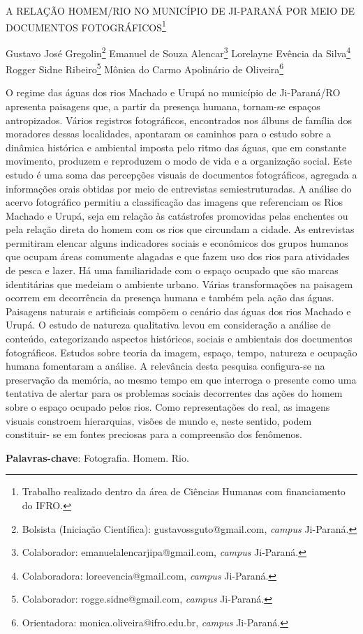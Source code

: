 \documentclass[article,12pt,onesidea,4paper,english,brazil]{abntex2}
\begin{document}
	
	
	\frenchspacing 
	
	\begin{center}
		\LARGE A RELAÇÃO HOMEM/RIO NO MUNICÍPIO DE JI-PARANÁ POR MEIO DE
		DOCUMENTOS FOTOGRÁFICOS\footnote{Trabalho realizado dentro da área de Ciências Humanas com financiamento do IFRO.}
		
		\normalsize
		Gustavo José Gregolin\footnote{Bolsista (Iniciação Científica): gustavossguto@gmail.com, \textit{campus} Ji-Paraná.} 
		Emanuel de Souza Alencar\footnote{Colaborador: emanuelalencarjipa@gmail.com, \textit{campus} Ji-Paraná.} 
		Lorelayne Evência da Silva\footnote{Colaboradora: loreevencia@gmail.com, \textit{campus} Ji-Paraná.} 
		Rogger Sidne Ribeiro\footnote{Colaborador: rogge.sidne@gmail.com, \textit{campus} Ji-Paraná.}
		Mônica do Carmo Apolinário de Oliveira\footnote{Orientadora: monica.oliveira@ifro.edu.br, \textit{campus} Ji-Paraná.} 
	\end{center}
	
	\noindent O regime das águas dos rios Machado e Urupá no município de Ji-Paraná/RO
	apresenta paisagens que, a partir da presença humana, tornam-se espaços
	antropizados. Vários registros fotográficos, encontrados nos álbuns de família dos
	moradores dessas localidades, apontaram os caminhos para o estudo sobre a
	dinâmica histórica e ambiental imposta pelo ritmo das águas, que em constante
	movimento, produzem e reproduzem o modo de vida e a organização social. Este
	estudo é uma soma das percepções visuais de documentos fotográficos, agregada a
	informações orais obtidas por meio de entrevistas semiestruturadas. A análise do
	acervo fotográfico permitiu a classificação das imagens que referenciam os Rios
	Machado e Urupá, seja em relação às catástrofes promovidas pelas enchentes ou
	pela relação direta do homem com os rios que circundam a cidade. As entrevistas
	permitiram elencar alguns indicadores sociais e econômicos dos grupos humanos
	que ocupam áreas comumente alagadas e que fazem uso dos rios para atividades
	de pesca e lazer. Há uma familiaridade com o espaço ocupado que são marcas
	identitárias que medeiam o ambiente urbano. Várias transformações na paisagem
	ocorrem em decorrência da presença humana e também pela ação das águas.
	Paisagens naturais e artificiais compõem o cenário das águas dos rios Machado e
	Urupá. O estudo de natureza qualitativa levou em consideração a análise de
	conteúdo, categorizando aspectos históricos, sociais e ambientais dos documentos
	fotográficos. Estudos sobre teoria da imagem, espaço, tempo, natureza e ocupação
	humana fomentaram a análise. A relevância desta pesquisa configura-se na
	preservação da memória, ao mesmo tempo em que interroga o presente como uma
	tentativa de alertar para os problemas sociais decorrentes das ações do homem
	sobre o espaço ocupado pelos rios. Como representações do real, as imagens	
	visuais constroem hierarquias, visões de mundo e, neste sentido, podem constituir-
	se em fontes preciosas para a compreensão dos fenômenos.
	
	\vspace{\onelineskip}
	
	\noindent
	\textbf{Palavras-chave}: Fotografia. Homem. Rio.
	
\end{document}

